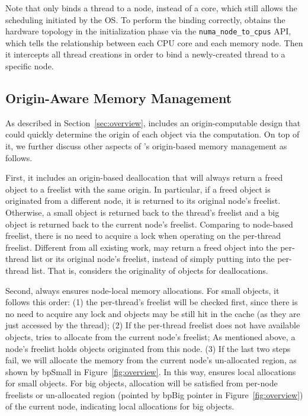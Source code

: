 Note that \NM{} only binds a thread to a node, instead of a core, which still allows the scheduling initiated by the OS. To perform the binding correctly, \NM{} obtains the hardware topology in the initialization phase via the \texttt{numa\_node\_to\_cpus} API, which tells the relationship between each CPU core and each memory node. Then it intercepts all thread creations in order to bind a newly-created thread to a specific node.

\subsection{Origin-Aware Memory Management} 
\label{sec:origin}


As described in Section~\ref{sec:overview}, \NM{} includes an origin-computable design that could quickly determine the origin of each object via the computation. On top of it, we further discuss other aspects of \NM{}'s origin-based memory management as follows.  

First, it includes an origin-based deallocation that will always return a freed object to a freelist with the same origin. In particular, if a freed object is originated from a different node, it is returned to its original node's  freelist. Otherwise, a small object is returned back to the thread's freelist and a big object is returned back to the current node's freelist. Comparing to node-based freelist, there is no need to acquire a lock when operating on the per-thread freelist. Different from all existing work, \NM{} may return a freed object into the per-thread list or its original node's freelist, instead of simply putting into the per-thread list. That is, \NM{} considers the originality of objects for deallocations. 

Second, \NM{} always ensures node-local memory allocations. For small objects, it follows this order: (1) the per-thread's freelist will be checked first, since there is no need to acquire any lock and objects may be still hit in the cache (as they are just accessed by the thread); (2) If the per-thread freelist does not have available objects, \NM{} tries to allocate from the current node's freelist; As mentioned above, a node's freelist holds objects originated from this node. (3) If the last two steps fail,  we will allocate the memory from the current node's un-allocated region, as shown by bpSmall in Figure~\ref{fig:overview}. In this way, 
\NM{} ensures local allocations for small objects. For big objects, allocation will be satisfied from per-node freelists or un-allocated region (pointed by bpBig pointer in Figure~\ref{fig:overview}) of the current node, indicating local allocations for big objects. 


